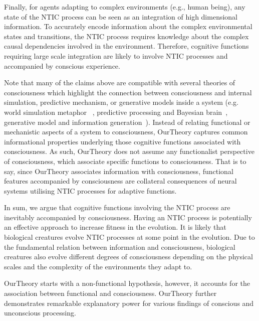 \documentclass[utf8]{article}
\begin{document}
    	    Finally, for agents adapting to complex environments (e.g., human being), any state of the NTIC process can be seen as an integration of high dimensional information. To accurately encode information about the complex environmental states and transitions, the NTIC process requires knowledge about the complex causal dependencies involved in the environment. Therefore, cognitive functions requiring large scale integration are likely to involve NTIC processes and accompanied by conscious experience. %
    	    
    	    Note that many of the claims above are compatible with several theories of consciousness which highlight the connection between consciousness and internal simulation, predictive mechanism, or generative models inside a system (e.g. world simulation metaphor ~\citep{revonsuo2006inner}, predictive processing and Bayesian brain~\citep{clark_2013,Hohwy2013,seth2014predictive}, generative model and information generation~\citep{kanai_chang_yu_de_abril_biehl_guttenberg_2019}). Instead of relating functional or mechanistic aspects of a system to consciousness, \ac{OurTheory} captures common informational properties underlying those cognitive functions associated with consciousness. As such, \ac{OurTheory} does not assume any functionalist perspective of consciousness, which associate specific functions to consciousness.  That is to say, since \ac{OurTheory} associates information  with consciousness, functional features accompanied by consciousness are collateral consequences of neural systems utilising NTIC processes for adaptive functions. 
    	    
    	    In sum, we argue that cognitive functions involving the NTIC process are inevitably accompanied by consciousness. Having an NTIC process is potentially an effective approach to increase fitness in the evolution. It is likely that biological creatures evolve NTIC processes at some point in the evolution. Due to the fundamental relation between information and consciousness, biological creatures also evolve different degrees of consciousness depending on the physical scales and the complexity of the environments they adapt to. 
    	    
    	    \ac{OurTheory} starts with a non-functional hypothesis, however, it accounts for the association between  functional and consciousness. \ac{OurTheory} further demonstrates remarkable explanatory power for various findings of conscious and unconscious processing. 
	    
\end{document}
